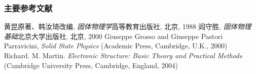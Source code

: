 \documentclass[cjk,slidestop,compress,mathserif,blue]{beamer}
\begin{document}
\appendix
\begin{thebibliography}{99}
\frame
{
\frametitle{主要参考文献}
{\small
	黄昆\:原著、韩汝琦\:改编, {\textit{固体物理学}}\:高等教育出版社, 北京, 1988
	阎守胜, {\textit{固体物理基础}}\:北京大学出版社, 北京, 2000
	\textrm{Giuseppe Grosso and Giuseppe Pastori Parravicini, {\textit{Solid State Physics}} (Academic Press, Cambridge, U.K., 2000)}
	\textrm{Richard. M. Martin. \textit{Electronic Structure: Basic Theory and Practical Methods} (Cambridge University Press, Cambridge, England, 2004)}
}
\nocite*{}
}
\end{thebibliography}



\end{document}
